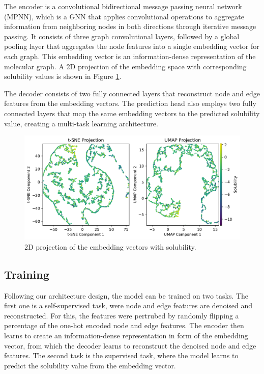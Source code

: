 \documentclass[11pt,a4paper]{article}
\begin{document}
The encoder is a convolutional bidirectional message passing neural network (MPNN), which is a GNN that applies convolutional operations to aggregate information from neighboring nodes in both directions through iterative message passing. It consists of three graph convolutional layers, followed by a global pooling layer that aggregates the node features into a single embedding vector for each graph. This embedding vector is an information-dense representation of the molecular graph. A 2D projection of the embedding space with corresponding solubility values is shown in Figure \ref{fig:solubility}.

The decoder consists of two fully connected layers that reconstruct node and edge features from the embedding vectors. The prediction head also employs two fully connected layers that map the same embedding vectors to the predicted solubility value, creating a multi-task learning architecture.

\begin{figure}[htbp]
        \centering
        \includegraphics[width=1\textwidth]{solubility.pdf}
        \caption{2D projection of the embedding vectors with solubility.}
        \label{fig:solubility}
\end{figure}

\subsection{Training}

Following our architecture design, the model can be trained on two tasks. The first one is a self-supervised task, were node and edge features are denoised and reconstructed. For this, the features were pertrubed by randomly flipping a percentage of the one-hot encoded node and edge features. The encoder then learns to create an information-dense representation in form of the embedding vector, from which the decoder learns to reconstruct the denoised node and edge features. The second task is the supervised task, where the model learns to predict the solubility value from the embedding vector.
\end{document}
